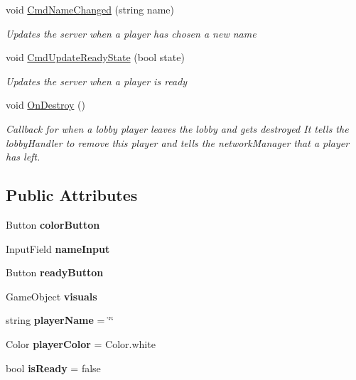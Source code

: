 \begin{DoxyCompactItemize}
void \hyperlink{class_d_l_network_lobby_player_a86e0dcdd5a6888bf43f1f9238d7ff3a1}{Cmd\+Name\+Changed} (string name)
\begin{DoxyCompactList}\small\item\em Updates the server when a player has chosen a new name \end{DoxyCompactList}\item 
void \hyperlink{class_d_l_network_lobby_player_a9b88470749df360bb66ba670e3de7be1}{Cmd\+Update\+Ready\+State} (bool state)
\begin{DoxyCompactList}\small\item\em Updates the server when a player is ready \end{DoxyCompactList}\item 
void \hyperlink{class_d_l_network_lobby_player_a63135a20581f45c883b629debf4e70ef}{On\+Destroy} ()
\begin{DoxyCompactList}\small\item\em Callback for when a lobby player leaves the lobby and gets destroyed It tells the lobby\+Handler to remove this player and tells the network\+Manager that a player has left. \end{DoxyCompactList}\end{DoxyCompactItemize}
\subsection*{Public Attributes}
\begin{DoxyCompactItemize}
\item 
\hypertarget{class_d_l_network_lobby_player_a24d30b2841a5e3c22ebde5b796373a29}{}\label{class_d_l_network_lobby_player_a24d30b2841a5e3c22ebde5b796373a29} 
Button {\bfseries color\+Button}
\item 
\hypertarget{class_d_l_network_lobby_player_ab835c869ac4aec1c15c40ef0434874bd}{}\label{class_d_l_network_lobby_player_ab835c869ac4aec1c15c40ef0434874bd} 
Input\+Field {\bfseries name\+Input}
\item 
\hypertarget{class_d_l_network_lobby_player_a478068b6d646940877ac11e573dbd404}{}\label{class_d_l_network_lobby_player_a478068b6d646940877ac11e573dbd404} 
Button {\bfseries ready\+Button}
\item 
\hypertarget{class_d_l_network_lobby_player_aa762174a81002ec9eef52099cb69685c}{}\label{class_d_l_network_lobby_player_aa762174a81002ec9eef52099cb69685c} 
Game\+Object {\bfseries visuals}
\item 
\hypertarget{class_d_l_network_lobby_player_a04b2586e10b137401a5ea09333b22657}{}\label{class_d_l_network_lobby_player_a04b2586e10b137401a5ea09333b22657} 
string {\bfseries player\+Name} = \char`\"{}\char`\"{}
\item 
\hypertarget{class_d_l_network_lobby_player_a9af28fac64b03bd6e1fb404158af6b35}{}\label{class_d_l_network_lobby_player_a9af28fac64b03bd6e1fb404158af6b35} 
Color {\bfseries player\+Color} = Color.\+white
\item 
\hypertarget{class_d_l_network_lobby_player_ac39421132ecd7348be4970b2792ea061}{}\label{class_d_l_network_lobby_player_ac39421132ecd7348be4970b2792ea061} 
bool {\bfseries is\+Ready} = false
\end{DoxyCompactItemize}


